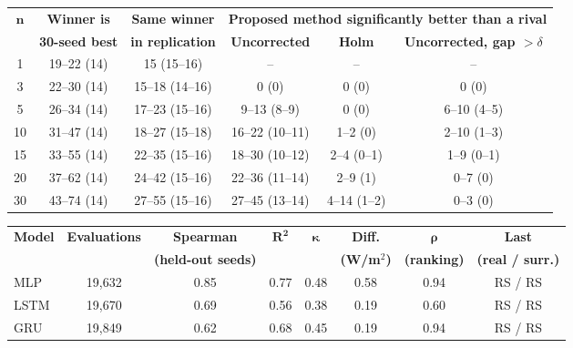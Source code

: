 \begin{tabular}{cccccc}
\toprule
$\boldsymbol{n}$ & \textbf{Winner is} & \textbf{Same winner} & \multicolumn{3}{c}{\textbf{Proposed method significantly better than a rival}} \\
\cmidrule(lr){4-6}
 & \textbf{30-seed best} & \textbf{in replication} & \textbf{Uncorrected} & \textbf{Holm} & \textbf{Uncorrected, gap $>\delta$} \\
\midrule
1 & 19--22 (14) & 15 (15--16) & -- & -- & -- \\
3 & 22--30 (14) & 15--18 (14--16) & 0 (0) & 0 (0) & 0 (0) \\
5 & 26--34 (14) & 17--23 (15--16) & 9--13 (8--9) & 0 (0) & 6--10 (4--5) \\
10 & 31--47 (14) & 18--27 (15--18) & 16--22 (10--11) & 1--2 (0) & 2--10 (1--3) \\
15 & 33--55 (14) & 22--35 (15--16) & 18--30 (10--12) & 2--4 (0--1) & 1--9 (0--1) \\
20 & 37--62 (14) & 24--42 (15--16) & 22--36 (11--14) & 2--9 (1) & 0--7 (0) \\
30 & 43--74 (14) & 27--55 (15--16) & 27--45 (13--14) & 4--14 (1--2) & 0--3 (0) \\
\bottomrule
\end{tabular}

\begin{tabular}{lccccccc}
\toprule
\textbf{Model} & \textbf{Evaluations} & \textbf{Spearman} & $\boldsymbol{R^2}$ & $\boldsymbol{\kappa}$ & \textbf{Diff.} & $\boldsymbol{\rho}$ & \textbf{Last} \\
 & & \textbf{(held-out seeds)} & & & \textbf{(W/m$^2$)} & \textbf{(ranking)} & \textbf{(real / surr.)} \\
\midrule
MLP & 19{,}632 & 0.85 & 0.77 & 0.48 & 0.58 & 0.94 & RS / RS \\
LSTM & 19{,}670 & 0.69 & 0.56 & 0.38 & 0.19 & 0.60 & RS / RS \\
GRU & 19{,}849 & 0.62 & 0.68 & 0.45 & 0.19 & 0.94 & RS / RS \\
\bottomrule
\end{tabular}

